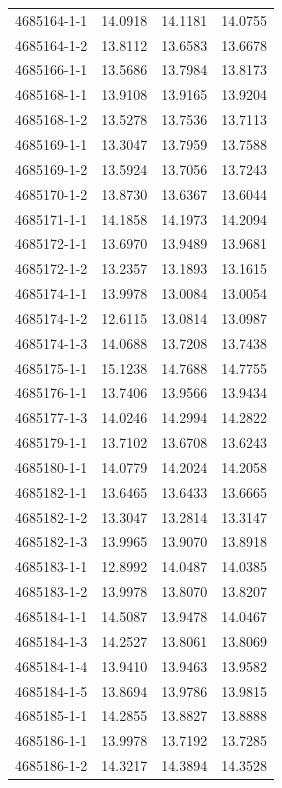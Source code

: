 \begin{longtable}{lrrr}
4685164-1-1 & 14.0918 & 14.1181 & 14.0755 \\
4685164-1-2 & 13.8112 & 13.6583 & 13.6678 \\
4685166-1-1 & 13.5686 & 13.7984 & 13.8173 \\
4685168-1-1 & 13.9108 & 13.9165 & 13.9204 \\
4685168-1-2 & 13.5278 & 13.7536 & 13.7113 \\
4685169-1-1 & 13.3047 & 13.7959 & 13.7588 \\
4685169-1-2 & 13.5924 & 13.7056 & 13.7243 \\
4685170-1-2 & 13.8730 & 13.6367 & 13.6044 \\
4685171-1-1 & 14.1858 & 14.1973 & 14.2094 \\
4685172-1-1 & 13.6970 & 13.9489 & 13.9681 \\
4685172-1-2 & 13.2357 & 13.1893 & 13.1615 \\
4685174-1-1 & 13.9978 & 13.0084 & 13.0054 \\
4685174-1-2 & 12.6115 & 13.0814 & 13.0987 \\
4685174-1-3 & 14.0688 & 13.7208 & 13.7438 \\
4685175-1-1 & 15.1238 & 14.7688 & 14.7755 \\
4685176-1-1 & 13.7406 & 13.9566 & 13.9434 \\
4685177-1-3 & 14.0246 & 14.2994 & 14.2822 \\
4685179-1-1 & 13.7102 & 13.6708 & 13.6243 \\
4685180-1-1 & 14.0779 & 14.2024 & 14.2058 \\
4685182-1-1 & 13.6465 & 13.6433 & 13.6665 \\
4685182-1-2 & 13.3047 & 13.2814 & 13.3147 \\
4685182-1-3 & 13.9965 & 13.9070 & 13.8918 \\
4685183-1-1 & 12.8992 & 14.0487 & 14.0385 \\
4685183-1-2 & 13.9978 & 13.8070 & 13.8207 \\
4685184-1-1 & 14.5087 & 13.9478 & 14.0467 \\
4685184-1-3 & 14.2527 & 13.8061 & 13.8069 \\
4685184-1-4 & 13.9410 & 13.9463 & 13.9582 \\
4685184-1-5 & 13.8694 & 13.9786 & 13.9815 \\
4685185-1-1 & 14.2855 & 13.8827 & 13.8888 \\
4685186-1-1 & 13.9978 & 13.7192 & 13.7285 \\
4685186-1-2 & 14.3217 & 14.3894 & 14.3528 \\

\end{longtable}
